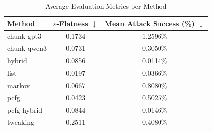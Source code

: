 \begin{table}[h]
\centering
\caption{Average Evaluation Metrics per Method}
\label{tab:honeyword-metrics}
\begin{tabular}{lcc}
\hline
Method & $\varepsilon$-Flatness $\downarrow$ & Mean Attack Success (\%) $\downarrow$ \\
\hline
  chunk-gpt3 & 0.1734 & 1.2596\% \\
  chunk-qwen3 & 0.0731 & 0.3050\% \\
  hybrid & 0.0856 & 0.0114\% \\
  list & 0.0197 & 0.0366\% \\
  markov & 0.0667 & 0.8080\% \\
  pcfg & 0.0423 & 0.5025\% \\
  pcfg-hybrid & 0.0844 & 0.0146\% \\
  tweaking & 0.2511 & 0.4080\% \\
\hline
\end{tabular}
\end{table}